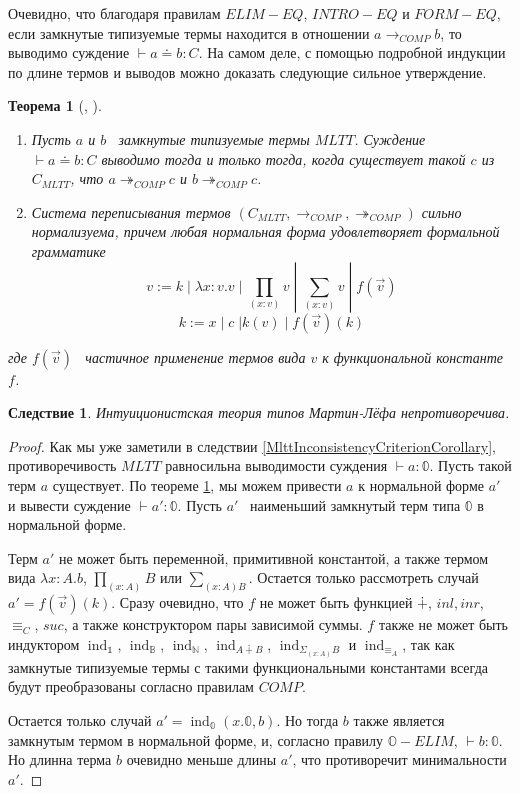 \documentclass{article}[12pt]
\newtheorem{theorem}{Теорема}
\newtheorem{corollary}{Следствие}
\newcommand{\dash}{\textemdash\ }
\newcommand{\ind}{\operatorname{ind}}
\begin{document}
Очевидно, что благодаря правилам $ELIM-EQ$, $INTRO-EQ$ и $FORM-EQ$, если замкнутые типизуемые термы находится
в отношении $a \rightarrow_{COMP} b$, то выводимо суждение $\vdash a \doteq b : C$. На самом деле,
с помощью подробной индукции по длине термов и выводов можно доказать следующие сильное утверждение.
\begin{theorem}[\cite{Mart75}, \cite{HoTTBook}]
    \label{MlttStrongNormalization}
    
    \begin{enumerate}
        \item Пусть $a$ и $b$ \dash замкнутые типизуемые термы $MLTT$. Суждение \\
        $\vdash a \doteq b : C$ выводимо тогда и только тогда, когда существует такой $c$ из $C_{MLTT}$,
        что $a \twoheadrightarrow_{COMP} c$ и $b \twoheadrightarrow_{COMP} c$.
        \item Система переписывания термов $(C_{MLTT}, \rightarrow_{COMP}, \twoheadrightarrow_{COMP})$
        сильно нормализуема, причем любая нормальная форма удовлетворяет формальной грамматике
        $$v := k \; | \; \lambda x : v . v \; | \; \prod_{(x : v)} v \; | \; \sum_{(x : v)} v \; | \; f(\overrightarrow{v})$$
        $$k := x \; | \; c \; | k(v) \; | \; f(\overrightarrow{v})(k)$$
    \end{enumerate}
    где $f(\overrightarrow{v})$ \dash частичное применение термов вида $v$ к функциональной константе $f$.
\end{theorem}

\begin{corollary}
    Интуиционистская теория типов Мартин-Лёфа непротиворечива.
\end{corollary}
\begin{proof}
    Как мы уже заметили в следствии \ref{MlttInconsistencyCriterionCorollary}, противоречивость
    $MLTT$ равносильна выводимости суждения $\vdash a : \mathbb 0$.
    Пусть такой терм $a$ существует. По теореме \ref{MlttStrongNormalization},
    мы можем привести $a$ к нормальной форме $a'$ и вывести суждение $\vdash a' : \mathbb 0$.
    Пусть $a'$ \dash наименьший замкнутый терм типа $\mathbb 0$ в нормальной форме.

    Терм $a'$ не может быть переменной, примитивной константой, а также термом вида $\lambda x : A . b$,
    $\prod_{(x : A)} B$ или $\sum_{(x : A) B}$. Остается только рассмотреть случай $a' = f(\overrightarrow{v})(k)$.
    Сразу очевидно, что $f$ не может быть функцией $\dotplus$, $inl, inr$, $\equiv_C$, $suc$, а также конструктором
    пары зависимой суммы. $f$  также не может быть индуктором $\ind_{\mathbb 1}$, $\ind_{\mathbb B}$,
    $\ind_{\mathbb N}$, $\ind_{A \dotplus B}$, $\ind_{\Sigma_{(x : A)} B}$ и $\ind_{\equiv_A}$, так
    как замкнутые типизуемые термы с такими функциональными константами всегда будут 
    преобразованы согласно правилам $COMP$.

    Остается только случай $a' = \ind_{\mathbb 0}(x.\mathbb 0, b)$. Но тогда $b$ также является замкнутым
    термом в нормальной форме, и, согласно правилу $\mathbb O-ELIM$, $\vdash b : \mathbb 0$. Но длинна
    терма $b$ очевидно меньше длины $a'$, что противоречит минимальности $a'$.
\end{proof}
\end{document}
